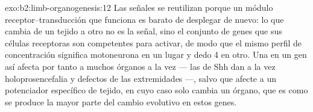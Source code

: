 \begin{solution}{exo:b2:limb-organogenesis:12}
Las señales se reutilizan porque un módulo receptor--transducción que
funciona es barato de desplegar de nuevo: lo que cambia de un tejido a
otro no es la señal, sino el conjunto de genes que sus células receptoras
son competentes para activar, de modo que el mismo perfil de
concentración significa motoneurona en un lugar y dedo 4 en otro. Una
 en un gen así afecta por tanto a muchos órganos a la vez --- las
 de Shh dan a la vez holoprosencefalia y defectos de las
extremidades ---, salvo que afecte a un potenciador específico de tejido,
en cuyo caso solo cambia un órgano, que es como se produce la mayor parte
del cambio evolutivo en estos genes.
\end{solution}

